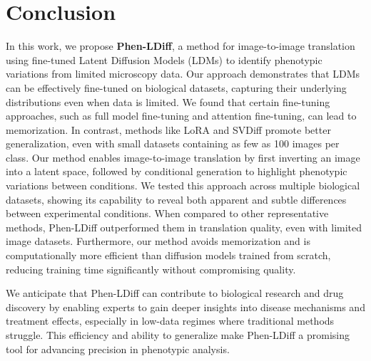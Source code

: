 \section{Conclusion}

In this work, we propose \textbf{Phen-LDiff}, a method for image-to-image translation using fine-tuned Latent Diffusion Models (LDMs) to identify phenotypic variations from limited microscopy data. Our approach demonstrates that LDMs can be effectively fine-tuned on biological datasets, capturing their underlying distributions even when data is limited. We found that certain fine-tuning approaches, such as full model fine-tuning and attention fine-tuning, can lead to memorization. In contrast, methods like LoRA and SVDiff promote better generalization, even with small datasets containing as few as 100 images per class. Our method enables image-to-image translation by first inverting an image into a latent space, followed by conditional generation to highlight phenotypic variations between conditions. We tested this approach across multiple biological datasets, showing its capability to reveal both apparent and subtle differences between experimental conditions. When compared to other representative methods, Phen-LDiff outperformed them in translation quality, even with limited image datasets.  Furthermore, our method avoids memorization and is computationally more efficient than diffusion models trained from scratch, reducing training time significantly without compromising quality. 

We anticipate that Phen-LDiff can contribute to biological research and drug discovery by enabling experts to gain deeper insights into disease mechanisms and treatment effects, especially in low-data regimes where traditional methods struggle. This efficiency and ability to generalize make Phen-LDiff a promising tool for advancing precision in phenotypic analysis.




